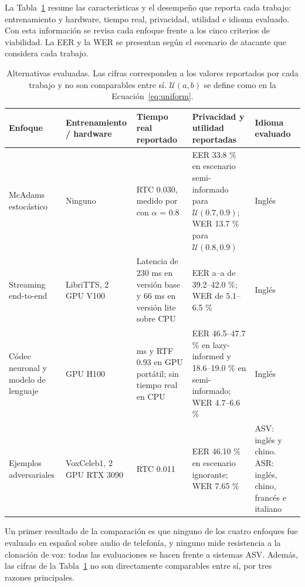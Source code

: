 \documentclass[10pt,twocolumn]{article}
\newcommand{\textcite}[1]{\citet{#1}}
\newcommand{\parencite}[1]{\citep{#1}}
\begin{document}
La Tabla~\ref{tab:alternativas} resume las características y el desempeño que reporta cada trabajo: entrenamiento y hardware, tiempo real, privacidad, utilidad e idioma evaluado. Con esta información se revisa cada enfoque frente a los cinco criterios de viabilidad. La EER y la WER se presentan según el escenario de atacante que considera cada trabajo.

\begin{table}[!t]
\centering
\caption{Alternativas evaluadas. Las cifras corresponden a los valores reportados por cada trabajo y no son comparables entre sí. $\mathcal{U}(a,b)$ se define como en la Ecuación~\ref{eq:uniform}.}
\label{tab:alternativas}
\footnotesize
\renewcommand{\arraystretch}{1.16}
\setlength{\tabcolsep}{4pt}
\begin{tabularx}{\textwidth}{>{\raggedright\arraybackslash}p{2.25cm}>{\raggedright\arraybackslash}p{2.3cm}>{\raggedright\arraybackslash}p{3.2cm}>{\raggedright\arraybackslash}X>{\raggedright\arraybackslash}p{2.3cm}}
\toprule
\textbf{Enfoque} & \textbf{Entrenamiento / hardware} & \textbf{Tiempo real reportado} & \textbf{Privacidad y utilidad reportadas} & \textbf{Idioma evaluado} \\
\midrule
McAdams estocástico \parencite{patino2021} & Ninguno & RTC 0.030, medido por \textcite{deng2023} con $\alpha$ = 0.8 & EER 33.8 \% en escenario semi-informado para $\mathcal{U}(0.7,0.9)$; WER 13.7 \% para $\mathcal{U}(0.8,0.9)$ & Inglés \\
\addlinespace[2pt]
Streaming end-to-end \parencite{quamer2024} & LibriTTS, 2 GPU V100 & Latencia de 230 ms en versión base y 66 ms en versión lite sobre CPU & EER a--a de 39.2--42.0 \%; WER de 5.1--6.5 \% & Inglés \\
\addlinespace[2pt]
Códec neuronal y modelo de lenguaje \parencite{kuzmin2026} & 8 GPU H100 & 180 ms y RTF 0.93 en GPU portátil; sin tiempo real en CPU & EER 46.5--47.7 \% en lazy-informed y 18.6--19.0 \% en semi-informado; WER 4.7--6.6 \% & Inglés \\
\addlinespace[2pt]
Ejemplos adversariales \parencite{deng2023} & VoxCeleb1, 2 GPU RTX 3090 & RTC 0.011 & EER 46.10 \% en escenario ignorante; WER 7.65 \% & ASV: inglés y chino. ASR: inglés, chino, francés e italiano \\
\bottomrule
\end{tabularx}
\end{table}


Un primer resultado de la comparación es que ninguno de los cuatro enfoques fue evaluado en español sobre audio de telefonía, y ninguno mide resistencia a la clonación de voz: todas las evaluaciones se hacen frente a sistemas ASV. Además, las cifras de la Tabla~\ref{tab:alternativas} no son directamente comparables entre sí, por tres razones principales.
\end{document}
